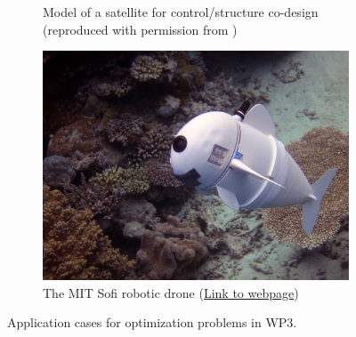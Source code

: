 \documentclass[12pt]{article}
\begin{document}
\begin{figure}[tbh]
\begin{subfigure}[t]{0.3\textwidth}
			\caption{Model of a satellite for control/structure co-design (reproduced with permission from \cite{finozzi2022sub})}
			\label{fig:codesign_sat}
		\end{subfigure}\hfill
		\begin{subfigure}[t]{0.35\textwidth}
			\includegraphics[width=\columnwidth]{Sofi_MIT.jpeg}%
			\caption{The MIT Sofi robotic drone (\href{https://www.csail.mit.edu/research/sofi-soft-robotic-fish}{Link to webpage})}
			\label{fig:sofi-mit}
		\end{subfigure}
		\caption[]{Application cases for optimization problems in WP3.}%
		\label{fig:optmisation}%
	\end{figure}






\end{document}
